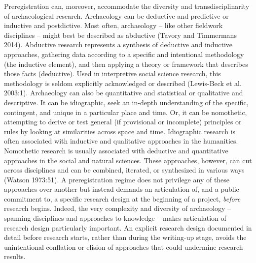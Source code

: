 \documentclass[article]{sa}
\begin{document}
Preregistration can, moreover, accommodate the diversity and
transdisciplinarity of archaeological research. Archaeology can be
deductive and predictive or inductive and postdictive. Most often,
archaeology -- like other fieldwork disciplines -- might best be
described as abductive (Tavory and Timmermans 2014). Abductive research
represents a synthesis of deductive and inductive approaches, gathering
data according to a specific and intentional methodology (the inductive
element), and then applying a theory or framework that describes those
facts (deductive). Used in interpretive social science research, this
methodology is seldom explicitly acknowledged or described (Lewis-Beck
et al. 2003:1). Archaeology can also be quantitative and statistical or
qualitative and descriptive. It can be idiographic, seek an in-depth
understanding of the specific, contingent, and unique in a particular
place and time. Or, it can be nomothetic, attempting to derive or test
general (if provisional or incomplete) principles or rules by looking at
similarities across space and time. Idiographic research is often
associated with inductive and qualitative approaches in the humanities.
Nomothetic research is usually associated with deductive and
quantitative approaches in the social and natural sciences. These
approaches, however, can cut across disciplines and can be combined,
iterated, or synthesized in various ways (Watson 1973:51). A
preregistration regime does not privilege any of these approaches over
another but instead demands an articulation of, and a public commitment
to, a specific research design at the beginning of a project,
\emph{before} research begins. Indeed, the very complexity and diversity
of archaeology -- spanning disciplines and approaches to knowledge
-- makes articulation of research design particularly important. An
explicit research design documented in detail before research starts,
rather than during the writing-up stage, avoids the unintentional
conflation or elision of approaches that could undermine research
results.
\end{document}
